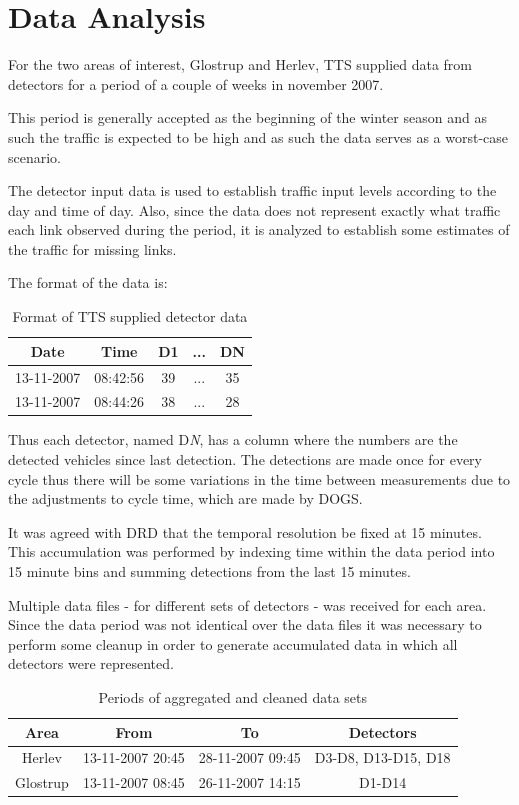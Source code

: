 \section{Data Analysis}
For the two areas of interest, Glostrup and Herlev, TTS supplied data from detectors for a period of a couple of weeks in november 2007.

This period is generally accepted as the beginning of the winter season and as such the traffic is expected to be high and as such the data serves as a worst-case scenario.

The detector input data is used to establish traffic input levels according to the day and time of day. Also, since the data does not represent exactly what traffic each link observed during the period, it is analyzed to establish some estimates of the traffic for missing links.

The format of the data is:

\begin{table}[!ht]
\begin{center}
\begin{tabular}{c|c|c|c|c}
\textbf{Date} & \textbf{Time} & \textbf{D1} & \textbf{...} & \textbf{DN} \\ \hline
13-11-2007 & 08:42:56 & 39 & ... & 35 \\
13-11-2007 & 08:44:26 & 38 & ...  & 28 \\
\end{tabular}
\end{center}
\caption{Format of TTS supplied detector data}
\label{tab:dataformat}
\end{table}

Thus each detector, named D\textit{N}, has a column where the numbers are the detected vehicles since last detection. The detections are made once for every cycle thus there will be some variations in the time between measurements due to the adjustments to cycle time, which are made by DOGS.

It was agreed with DRD that the temporal resolution be fixed at 15 minutes. This accumulation was performed by indexing time within the data period into 15 minute bins and summing detections from the last 15 minutes.

Multiple data files - for different sets of detectors - was received for each area. Since the data period was not identical over the data files it was necessary to perform some cleanup in order to generate accumulated data in which all detectors were represented.

\begin{table}[!ht]
\begin{center}
\begin{tabular}{c|c|c|c}
\textbf{Area} & \textbf{From} & \textbf{To} & \textbf{Detectors} \\ \hline
Herlev & 13-11-2007 20:45 & 28-11-2007 09:45 & D3-D8, D13-D15, D18 \\
Glostrup & 13-11-2007 08:45 & 26-11-2007 14:15 & D1-D14 \\
\end{tabular}
\end{center}
\caption{Periods of aggregated and cleaned data sets}
\label{tab:dataperiod}
\end{table}

